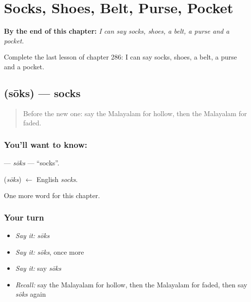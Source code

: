 
\chapter{Socks, Shoes, Belt, Purse, Pocket}
\label{ch:ml-socks-shoes-belt-purse-pocket}

\begin{chapteropening}
\textbf{By the end of this chapter:} \emph{I can say socks, shoes, a belt, a purse and a pocket.}

Complete the last lesson of chapter 286: I can say socks, shoes, a belt, a purse and a pocket.
\end{chapteropening}

\section[\texorpdfstring{\ml{സോക്സ്} (sōks)}{സോക്സ് (sōks)}]{ (sōks) — socks}

\label{lesson:ML-C286-soks}



\begin{quote}
Before the new one: say the Malayalam for hollow, then the Malayalam for faded.
\end{quote}

\subsection*{You'll want to know: }
\textbf{} — \emph{sōks} — \textquotedblleft{}socks\textquotedblright{}.

\begin{cousinweb}
\textbf{} (\emph{sōks}) $\leftarrow$ English \emph{socks}.
\end{cousinweb}

\begin{grammarlens}[title={What you've built}]
One more word for this chapter.
\end{grammarlens}

\subsection*{Your turn}
\begin{itemize}
\raggedright
  \item \emph{Say it:} \emph{sōks}
  \item \emph{Say it:} \emph{sōks}, once more
  \item \emph{Say it:} say \emph{sōks}
  \item \emph{Recall:} say the Malayalam for hollow, then the Malayalam for faded, then say \emph{sōks} again
\end{itemize}

